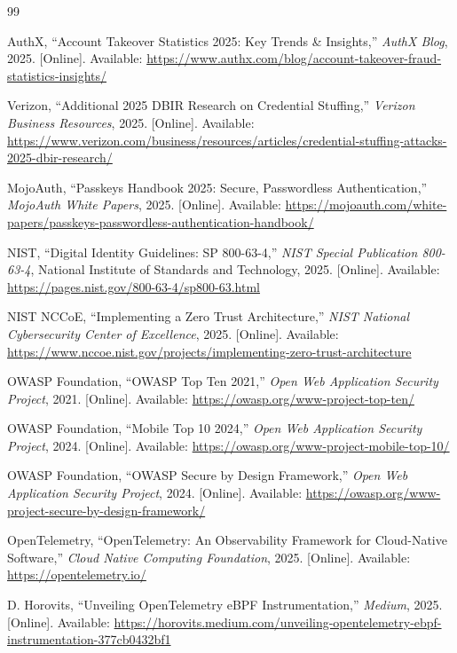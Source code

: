 \documentclass[12pt, a4paper]{article}
\begin{document}
\newpage

\begin{thebibliography}{99}

AuthX, ``Account Takeover Statistics 2025: Key Trends \& Insights,''
\textit{AuthX Blog}, 2025. [Online]. Available:
\url{https://www.authx.com/blog/account-takeover-fraud-statistics-insights/}

Verizon, ``Additional 2025 DBIR Research on Credential Stuffing,''
\textit{Verizon Business Resources}, 2025. [Online]. Available:
\url{https://www.verizon.com/business/resources/articles/credential-stuffing-attacks-2025-dbir-research/}

MojoAuth, ``Passkeys Handbook 2025: Secure, Passwordless Authentication,''
\textit{MojoAuth White Papers}, 2025. [Online]. Available:
\url{https://mojoauth.com/white-papers/passkeys-passwordless-authentication-handbook/}

NIST, ``Digital Identity Guidelines: SP 800-63-4,'' \textit{NIST Special
Publication 800-63-4}, National Institute of Standards and Technology, 2025.
[Online]. Available: \url{https://pages.nist.gov/800-63-4/sp800-63.html}

NIST NCCoE, ``Implementing a Zero Trust Architecture,'' \textit{NIST
National Cybersecurity Center of Excellence}, 2025. [Online]. Available:
\url{https://www.nccoe.nist.gov/projects/implementing-zero-trust-architecture}

OWASP Foundation, ``OWASP Top Ten 2021,'' \textit{Open Web Application
Security Project}, 2021. [Online]. Available:
\url{https://owasp.org/www-project-top-ten/}

OWASP Foundation, ``Mobile Top 10 2024,'' \textit{Open Web Application
Security Project}, 2024. [Online]. Available:
\url{https://owasp.org/www-project-mobile-top-10/}

OWASP Foundation, ``OWASP Secure by Design Framework,'' \textit{Open Web
Application Security Project}, 2024. [Online]. Available:
\url{https://owasp.org/www-project-secure-by-design-framework/}

OpenTelemetry, ``OpenTelemetry: An Observability Framework for Cloud-Native
Software,'' \textit{Cloud Native Computing Foundation}, 2025. [Online].
Available: \url{https://opentelemetry.io/}

D. Horovits, ``Unveiling OpenTelemetry eBPF Instrumentation,''
\textit{Medium}, 2025. [Online]. Available:
\url{https://horovits.medium.com/unveiling-opentelemetry-ebpf-instrumentation-377cb0432bf1}


\end{thebibliography}
\end{document}
